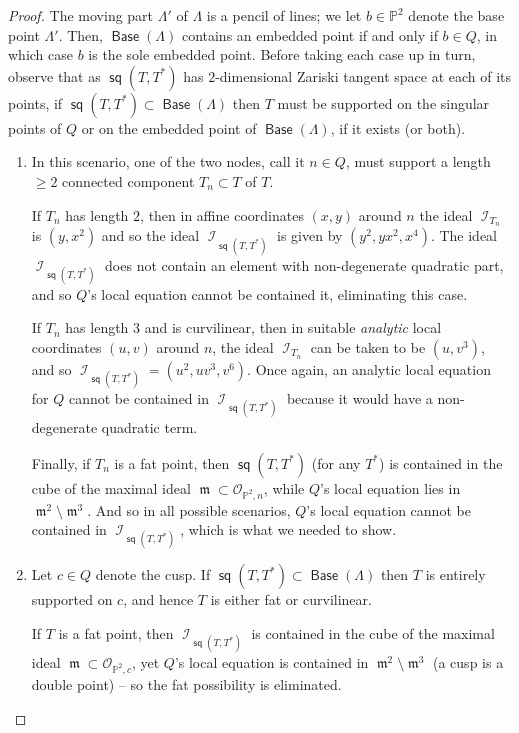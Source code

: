 \documentclass[reqno, 11pt]{amsart}
\theoremstyle{plain}
\theoremstyle{remark}
\renewcommand{\P}{\mathbb{P}}
\DeclareMathOperator{\I}{\mathcal{I}}
\renewcommand{\O}{\mathcal{O}}
\DeclareMathOperator{\s}{\mathsf{sq}}
\DeclareMathOperator{\Base}{\mathsf{Base}}
\DeclareMathOperator{\m}{\mathfrak{m}}
\begin{document}
\begin{proof}
    The moving part $\Lambda'$ of $\Lambda$ is a pencil of lines; we let $b \in \P^{2}$ denote the base point $\Lambda'$.  Then, $\Base (\Lambda)$ contains an embedded point if and only if $b \in Q$, in which case $b$ is the sole embedded point. Before taking each case up in turn, observe that as $\s(T,T^{*})$ has $2$-dimensional Zariski tangent space at each of its points, if $\s(T,T^{*}) \subset \Base(\Lambda)$ then $T$ must be supported on the singular points of $Q$ or on the embedded point of $\Base(\Lambda)$, if it exists (or both).
    \begin{enumerate}
        \item[(a)] In this scenario, one of the two nodes, call it $n \in Q$, must support a length $\geq 2$ connected component $T_{n} \subset T$ of $T$. 
        
        If $T_{n}$ has length $2$, then in affine coordinates $(x,y)$ around $n$ the ideal $\I_{T_{n}}$ is $(y,x^{2})$ and so the ideal $\I_{\s(T,T^{*})}$ is given by $(y^{2},yx^{2},x^{4})$.  The ideal $\I_{\s(T,T^{*})}$ does not contain an element with non-degenerate quadratic part, and so $Q$'s local equation cannot be contained it, eliminating this case.  
        
        If $T_{n}$ has length $3$ and is curvilinear, then in suitable \emph{analytic} local coordinates $(u,v)$ around $n$, the ideal $\I_{T_{n}}$ can be taken to be $(u,v^{3})$, and so $\I_{\s(T,T^{*})} = (u^{2},uv^{3},v^{6})$.  Once again, an analytic local equation for $Q$ cannot  be contained in $\I_{\s(T,T^{*})}$ because it would have a non-degenerate quadratic term. 
        
        Finally, if $T_{n}$ is a fat point, then $\s(T,T^{*})$ (for any $T^{*}$) is contained in the cube of the maximal ideal $\m \subset \O_{\P^{2},n}$, while $Q$'s local equation lies in $\m^{2} \setminus \m^{3}$.  And so in all possible scenarios, $Q$'s local equation cannot be contained in $\I_{\s(T,T^{*})}$, which is what we needed to show.
        
        \item[(b)] Let $c \in Q$ denote the cusp. If $\s(T,T^{*}) \subset \Base(\Lambda)$ then $T$ is entirely supported on $c$, and hence $T$ is either fat or curvilinear. 
        
        If $T$ is a fat point, then $\I_{\s(T,T^{*})}$ is contained in the cube of the maximal ideal $\m \subset \O_{\P^{2},c}$, yet $Q$'s local equation is contained in $\m^{2} \setminus \m^{3}$ (a cusp is a double point) -- so the fat possibility is eliminated. 
        

\end{enumerate}
\end{proof}
\end{document}
